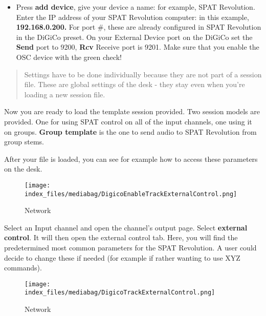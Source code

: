 \documentclass[
  letterpaper,
  DIV=11,
  numbers=noendperiod]{scrreport}
\providecommand{\tightlist}{%
  \setlength{\itemsep}{0pt}\setlength{\parskip}{0pt}}\usepackage{longtable,booktabs,array}
\begin{document}
\begin{itemize}
\tightlist
\item
  Press \textbf{add device}, give your device a name: for example, SPAT
  Revolution. Enter the IP address of your SPAT Revolution computer: in
  this example, \textbf{192.168.0.200.} For port \#, these are already
  configured in SPAT Revolution in the DiGiCo preset. On your External
  Device port on the DiGiCo set the \textbf{Send} port to 9200,
  \textbf{Rcv} Receive port is 9201. Make sure that you enable the OSC
  device with the green check!
\end{itemize}

\begin{quote}
Settings have to be done individually because they are not part of a
session file. These are global settings of the desk - they stay even
when you're loading a new session file.
\end{quote}

Now you are ready to load the template session provided. Two session
models are provided. One for using SPAT control on all of the input
channels, one using it on groups. \textbf{Group template} is the one to
send audio to SPAT Revolution from group stems.

After your file is loaded, you can see for example how to access these
parameters on the desk.

\begin{figure}

{\centering \texttt{[image: index\_files/mediabag/DigicoEnableTrackExternalControl.png]}

}

\caption{Network}

\end{figure}

Select an Input channel and open the channel's output page. Select
\textbf{external control}. It will then open the external control tab.
Here, you will find the predetermined most common parameters for the
SPAT Revolution. A user could decide to change these if needed (for
example if rather wanting to use XYZ commands).

\begin{figure}

{\centering \texttt{[image: index\_files/mediabag/DigicoTrackExternalControl.png]}

}

\caption{Network}

\end{figure}
\end{document}
